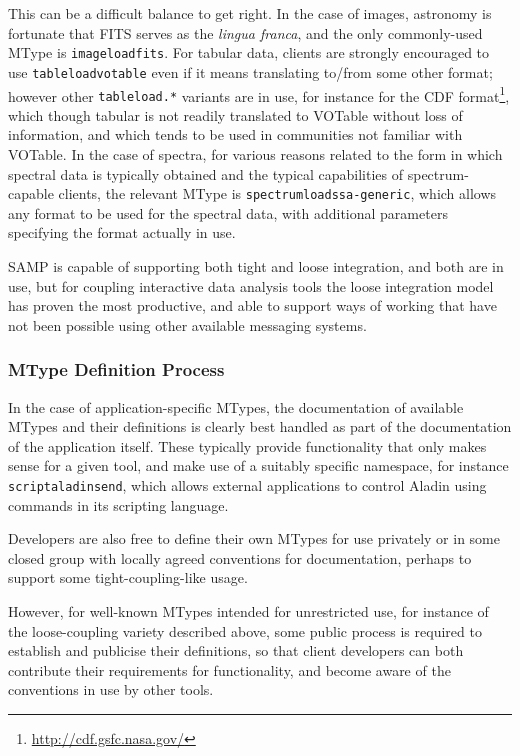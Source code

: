 \documentclass[5p]{elsarticle}
\begin{document}
This can be a difficult balance to get right.
In the case of images, astronomy is fortunate that FITS serves as
the {\em lingua franca\/}, and the only commonly-used MType is
{\tt image{\kdot}load{\kdot}fits}.
For tabular data, clients are strongly encouraged to use
{\tt table{\kdot}load{\kdot}votable} even if it means translating to/from
some other format; however other {\tt table{\kdot}load.*} variants are in use,
for instance for the CDF format\footnote{\url{http://cdf.gsfc.nasa.gov/}},
which though tabular is
not readily translated to VOTable without loss of information,
and which tends to be used in communities not familiar with VOTable.
In the case of spectra, for various reasons related to the
form in which spectral data is typically obtained and
the typical capabilities of spectrum-capable clients,
the relevant MType is {\tt spectrum{\kdot}load{\kdot}ssa-generic},
which allows any format to be used for the spectral data,
with additional parameters specifying
the format actually in use.

SAMP is capable of supporting both tight and loose integration,
and both are in use,
but for coupling interactive data analysis tools the loose integration
model has proven the most productive,
and able to support ways of working that have not been possible
using other available messaging systems.

\subsubsection{MType Definition Process}

In the case of application-specific MTypes, the documentation of
available MTypes and their definitions is clearly
best handled as part of the documentation of the application itself.
These typically provide functionality that only makes sense for
a given tool, and make use of a suitably specific namespace,
for instance {\tt script{\kdot}aladin{\kdot}send},
which allows external applications to control Aladin
\citep{2000A&AS..143...33B} using commands in its scripting language.

Developers are also free to define their own MTypes for use privately
or in some closed group with locally agreed conventions for documentation,
perhaps to support some tight-coupling-like usage.

However, for well-known MTypes intended for unrestricted use,
for instance of the loose-coupling variety described above,
some public process is required to establish
and publicise their definitions, so that client developers can
both contribute their requirements for functionality, and become aware
of the conventions in use by other tools.
\end{document}
